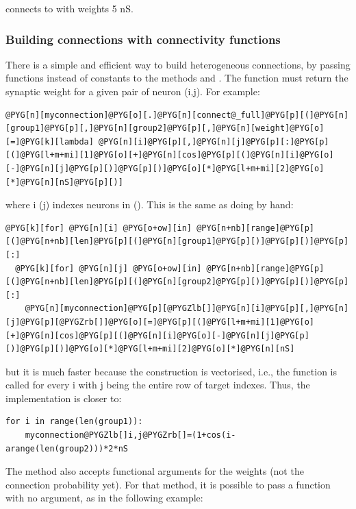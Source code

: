 \documentclass[letterpaper,10pt,english]{manual}
\begin{document}
connects  to  with weights 5 nS.


\subsubsection{Building connections with connectivity functions}

There is a simple and efficient way to build heterogeneous connections, by passing functions
instead of constants to the methods  and .
The function must return the synaptic weight for a given pair of neuron (i,j).
For example:

\begin{Verbatim}[commandchars=@\[\]]
@PYG[n][myconnection]@PYG[o][.]@PYG[n][connect@_full]@PYG[p][(]@PYG[n][group1]@PYG[p][,]@PYG[n][group2]@PYG[p][,]@PYG[n][weight]@PYG[o][=]@PYG[k][lambda] @PYG[n][i]@PYG[p][,]@PYG[n][j]@PYG[p][:]@PYG[p][(]@PYG[l+m+mi][1]@PYG[o][+]@PYG[n][cos]@PYG[p][(]@PYG[n][i]@PYG[o][-]@PYG[n][j]@PYG[p][)]@PYG[p][)]@PYG[o][*]@PYG[l+m+mi][2]@PYG[o][*]@PYG[n][nS]@PYG[p][)]
\end{Verbatim}

where i (j) indexes neurons in  (). This is the same as doing by hand:

\begin{Verbatim}[commandchars=@\[\]]
@PYG[k][for] @PYG[n][i] @PYG[o+ow][in] @PYG[n+nb][range]@PYG[p][(]@PYG[n+nb][len]@PYG[p][(]@PYG[n][group1]@PYG[p][)]@PYG[p][)]@PYG[p][:]
  @PYG[k][for] @PYG[n][j] @PYG[o+ow][in] @PYG[n+nb][range]@PYG[p][(]@PYG[n+nb][len]@PYG[p][(]@PYG[n][group2]@PYG[p][)]@PYG[p][)]@PYG[p][:]
    @PYG[n][myconnection]@PYG[p][@PYGZlb[]]@PYG[n][i]@PYG[p][,]@PYG[n][j]@PYG[p][@PYGZrb[]]@PYG[o][=]@PYG[p][(]@PYG[l+m+mi][1]@PYG[o][+]@PYG[n][cos]@PYG[p][(]@PYG[n][i]@PYG[o][-]@PYG[n][j]@PYG[p][)]@PYG[p][)]@PYG[o][*]@PYG[l+m+mi][2]@PYG[o][*]@PYG[n][nS]
\end{Verbatim}

but it is much faster because the construction is vectorised, i.e., the function is called for every i
with j being the entire row of target indexes. Thus, the implementation is closer to:

\begin{Verbatim}[commandchars=@\[\]]
for i in range(len(group1)):
    myconnection@PYGZlb[]i,j@PYGZrb[]=(1+cos(i-arange(len(group2)))*2*nS
\end{Verbatim}

The method  also accepts functional arguments for the
weights (not the connection probability yet). For that method, it is possible to pass a function
with no argument, as in the following example:
\end{document}
